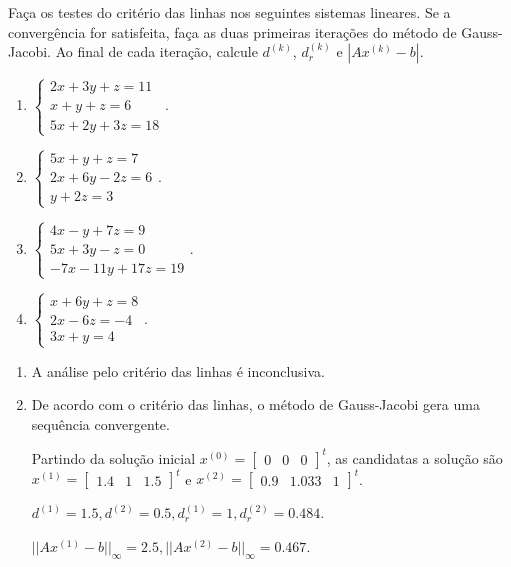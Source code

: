 \begin{ex}\label{jacobi}
Faça os testes do critério das linhas nos seguintes sistemas lineares. Se a convergência for satisfeita, faça as duas primeiras iterações do método de Gauss-Jacobi. Ao final de cada iteração, calcule $d^{(k)}$, $d_r^{(k)}$ e $|Ax^{(k)}-b|$.
\begin{enumerate}
\item $\begin{cases}
2x+3y+z=11\\
x+y+z=6\\
5x+2y+3z=18
\end{cases}.$
\item $\begin{cases}
5x+y+z=7\\
2x+6y-2z=6\\
y+2z=3
\end{cases}.$
\item $\begin{cases}
4x-y+7z=9\\
5x+3y-z=0\\
-7x-11y+17z=19
\end{cases}.$
\item $\begin{cases}
x+6y+z=8\\
2x-6z=-4\\
3x+y=4
\end{cases}.$
\end{enumerate}
\begin{sol}
\begin{enumerate}
\item A análise pelo critério das linhas é inconclusiva.
\item De acordo com o critério das linhas, o método de Gauss-Jacobi gera uma sequência convergente. 


Partindo da solução inicial $x^{(0)}=\begin{bmatrix}
0&0&0
\end{bmatrix}^t$, as candidatas a solução são $x^{(1)}=\begin{bmatrix}
1.4&1&1.5
\end{bmatrix}^t$ e $x^{(2)}=\begin{bmatrix}
0.9&1.033&1
\end{bmatrix}^t$.

$d^{(1)}=1.5, d^{(2)}=0.5, d_r^{(1)}=1,d_r^{(2)}=0.484$.

$||Ax^{(1)}-b||_\infty=2.5, ||Ax^{(2)}-b||_\infty=0.467$.
\end{enumerate}


\end{sol}
\end{ex}
